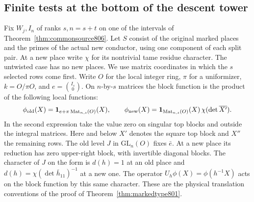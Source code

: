 \documentclass[a4paper,11pt]{article}
\theoremstyle{definition}
\theoremstyle{remark}
\numberwithin{equation}{section}
\begin{document}
\subsection{Finite tests at the bottom of the descent tower}
\label{sec:markedbottom847}
Fix \(W_j,I_n\) of ranks \(s,n=s+t\) on one of the intervals of
Theorem~\ref{thm:commonsource806}. Let \(S\) consist of the original
marked places and the primes of the actual new conductor, using
one component of each split pair. At a new place write \(\chi\)
for its nontrivial tame residue character. The untwisted case
has no new places. We use matrix coordinates in which the
\(s\) selected rows come first. Write \(O\) for the local
integer ring, \(\pi\) for a uniformizer, \(k=O/\pi O\), and
\(e=\binom{I_s}{0}\). On \(n\)-by-\(s\) matrices the block
function is the product of the following local functions:
\[
 \phi_{\rm old}(X)={\bf1}_{e+\pi\operatorname{Mat}_{n,s}(O)}(X),
 \qquad
 \phi_{\rm new}(X)
   ={\bf1}_{\operatorname{Mat}_{n,s}(O)}(X)\,
                         \chi(\det\overline{X'}).
\]
In the second expression take the value zero on singular top
blocks and outside the integral matrices. Here and below
\(X'\) denotes the square top block and \(X''\) the remaining
rows. The old level \(J\) in \(\mathrm{GL}_n(O)\) fixes
\(\bar e\). At a new place its reduction has zero upper-right
block, with invertible diagonal blocks. The character of \(J\)
on the form is \(d(h)=1\) at an old place and
\(d(h)=\chi(\det\bar h_{11})^{-1}\) at a new one. The operator
\(U_h\phi(X)=\phi(h^{-1}X)\) acts on the block function by this
same character. These are the physical translation conventions
of the proof of Theorem~\ref{thm:markedtype801}.
\end{document}
